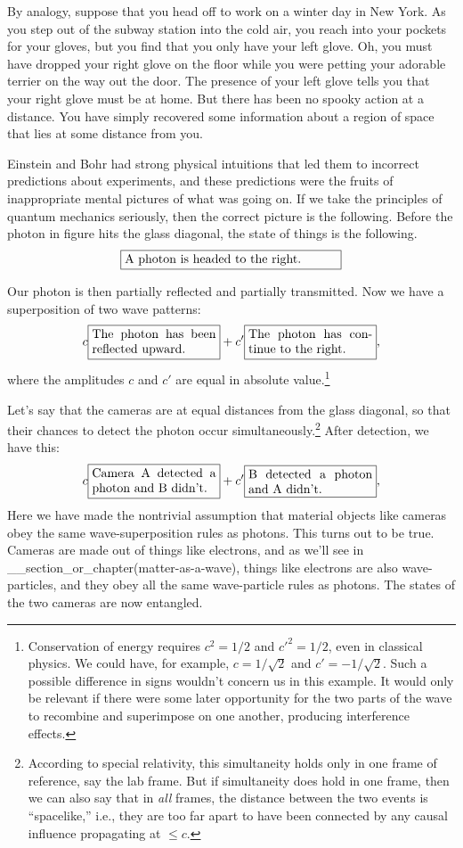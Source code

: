 By analogy, suppose that you head off to work on a winter day
in New York. As you step out of the subway station into the cold air,
you reach into your pockets for your gloves, but you find that
you only have your left glove. Oh, you must have dropped your right
glove on the floor while you were petting your adorable terrier on the way out the
door. The presence of your left glove tells you that your right glove
must be at home. But there has been no
spooky action at a distance. You have simply recovered some
information about a region of space that lies at some distance from
you.

Einstein and Bohr had strong physical intuitions that led them to
incorrect predictions about experiments, and these predictions were
the fruits of inappropriate mental pictures of what was going on. If we take
the principles of quantum mechanics seriously, then the correct picture
is the following. Before the photon in figure  hits the glass
diagonal, the state of things is the following.
\begin{equation*}
\fbox{\parbox{60mm}{A photon is headed to the right.}}
\end{equation*}

Our photon is then partially reflected and partially transmitted. Now we have
a superposition of two wave patterns:
\begin{equation*}
 c\fbox{\parbox{35mm}{The photon has been reflected upward.}}
+c'\fbox{\parbox{35mm}{The photon has continue to the right.}},
\end{equation*}
where the amplitudes $c$ and $c'$ are equal in absolute value.\footnote{
Conservation of energy requires $c^2=1/2$ and $c'^2=1/2$,
even in classical physics. We could have, for
example, $c=1/\sqrt{2}$ and $c'=-1/\sqrt{2}$. Such a possible difference in
signs wouldn't concern us in this example. It would only be relevant if there
were some later opportunity for the two parts of the wave to recombine and
superimpose on one another, producing interference effects.}

Let's say that the cameras are at equal distances from the glass diagonal,
so that their chances to detect the photon occur simultaneously.\footnote{
According to special relativity, this simultaneity holds only in one frame
of reference, say the lab frame. But if simultaneity does hold in one frame,
then we can also say that in \emph{all} frames, the distance between the two
events is ``spacelike,'' i.e., they are too far apart to have been connected
by any causal influence propagating at $\le c$.
}
After detection, we have this:
\begin{equation*}
 c\fbox{\parbox{35mm}{Camera A detected a photon and B didn't.}}
+c'\fbox{\parbox{35mm}{B detected a photon and A didn't.}},
\end{equation*}
Here we have made the nontrivial assumption that material objects like
cameras obey the same wave-superposition rules as photons. This turns out
to be true. Cameras are made out of things like electrons,
and as we'll see in __section_or_chapter(matter-as-a-wave), things like
electrons are also wave-particles, and they obey all the same wave-particle rules
as photons. The states of the two cameras are now entangled.


